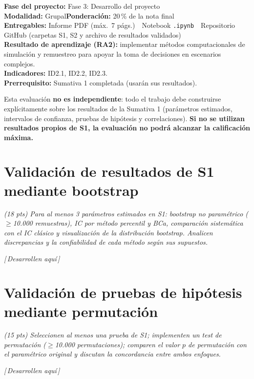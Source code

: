 \documentclass[11pt,a4paper]{article}
\newcommand{\guia}[1]{{\small\itshape\color{gris}#1}\par\vspace{0.15em}}
\newcommand{\resp}{{\footnotesize\itshape\color{fillgray}[\,Desarrollen aquí\,]}\par\vspace{1.1em}}
\begin{document}
\clearpage
{}
\begin{infobox}
\textbf{Fase del proyecto:} Fase 3: Desarrollo del proyecto\\
\textbf{Modalidad:} Grupal\qquad\textbf{Ponderación:} 20\,\% de la nota final\\
\textbf{Entregables:} Informe PDF (máx.\ 7 págs.)\ \textperiodcentered\ Notebook \texttt{.ipynb}\ \textperiodcentered\ Repositorio GitHub (carpetas S1, S2 y archivo de resultados validados)\\
\textbf{Resultado de aprendizaje (RA2):} implementar métodos computacionales de simulación y remuestreo para apoyar la toma de decisiones en escenarios complejos.\\
\textbf{Indicadores:} ID2.1, ID2.2, ID2.3.\\
\textbf{Prerrequisito:} Sumativa 1 completada (usarán sus resultados).
\end{infobox}
\begin{conexionbox}
Esta evaluación \textbf{no es independiente}: todo el trabajo debe construirse explícitamente sobre los resultados de la Sumativa 1 (parámetros estimados, intervalos de confianza, pruebas de hipótesis y correlaciones). \textbf{Si no se utilizan resultados propios de S1, la evaluación no podrá alcanzar la calificación máxima.}
\end{conexionbox}

\vspace{0.5em}
\tableofcontents
\newpage

\section{Validación de resultados de S1 mediante bootstrap}
\guia{(18 pts) Para al menos 3 parámetros estimados en S1: bootstrap no paramétrico ($\geq$10.000 remuestras), IC por método percentil y BCa, comparación sistemática con el IC clásico y visualización de la distribución bootstrap. Analicen discrepancias y la confiabilidad de cada método según sus supuestos.}
\resp

\section{Validación de pruebas de hipótesis mediante permutación}
\guia{(15 pts) Seleccionen al menos una prueba de S1; implementen un test de permutación ($\geq$10.000 permutaciones); comparen el valor $p$ de permutación con el paramétrico original y discutan la concordancia entre ambos enfoques.}
\resp
\end{document}
